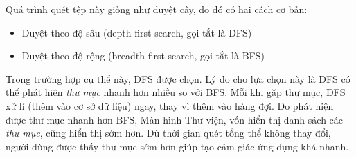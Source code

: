 \documentclass[../../../../thesis]{subfiles}
\begin{document}
Quá trình quét tệp này giống như duyệt cây, do đó có hai cách cơ bản:

\begin{itemize}
    \item
        Duyệt theo độ sâu (depth-first search, gọi tắt là DFS)
    \item
        Duyệt theo độ rộng (breadth-first search, gọi tắt là BFS)
\end{itemize}

Trong trường hợp cụ thể này, DFS được chọn. Lý do cho lựa chọn này là DFS có thể
phát hiện \emph{thư mục} nhanh hơn nhiều so với BFS. Mỗi khi gặp thư mục, DFS xử
lí (thêm vào cơ sở dữ liệu) ngay, thay vì thêm vào hàng đợi. Do phát hiện được
thư mục nhanh hơn BFS, Màn hình Thư viện, vốn hiển thị danh sách các \emph{thư
mục}, cũng hiển thị sớm hơn. Dù thời gian quét tổng thể không thay đổi, người
dùng được thấy thư mục sớm hơn giúp tạo cảm giác ứng dụng khá nhanh.
\end{document}
